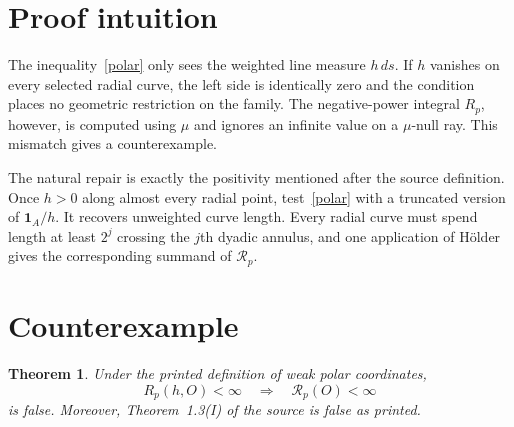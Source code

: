 \documentclass[11pt]{article}
\newtheorem{theorem}{Theorem}
\begin{document}
\section{Proof intuition}
The inequality~\eqref{polar} only sees the weighted line measure $h\,ds$.
If $h$ vanishes on every selected radial curve, the left side is identically
zero and the condition places no geometric restriction on the family.  The
negative-power integral $R_p$, however, is computed using $\mu$ and ignores
an infinite value on a $\mu$-null ray.  This mismatch gives a counterexample.

The natural repair is exactly the positivity mentioned after the source
definition.  Once $h>0$ along almost every radial point, test~\eqref{polar}
with a truncated version of $\mathbf1_A/h$.  It recovers unweighted curve
length.  Every radial curve must spend length at least $2^j$ crossing the
$j$th dyadic annulus, and one application of H\"older gives the corresponding
summand of $\mathcal R_p$.

\section{Counterexample}
\begin{theorem}\label{counterexample}
Under the printed definition of weak polar coordinates,
\[
 R_p(h,O)<\infty\quad\Longrightarrow\quad\mathcal R_p(O)<\infty
\]
is false.  Moreover, Theorem~1.3(I) of the source is false as printed.
\end{theorem}
\end{document}
